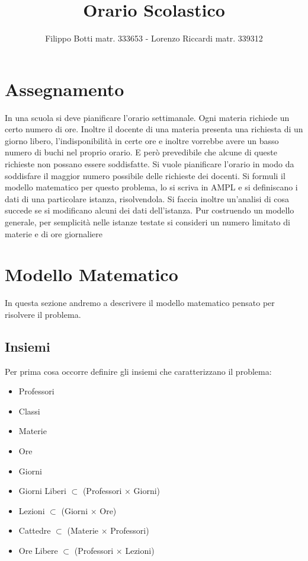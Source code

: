 \documentclass{article}
\title{Orario Scolastico}
\author{Filippo Botti matr. 333653 - Lorenzo Riccardi matr. 339312}
\begin{document}
\maketitle



\section{Assegnamento}
In una scuola si deve pianificare l’orario settimanale. Ogni materia richiede un
certo numero di ore. Inoltre il docente di una materia presenta una richiesta di
un giorno libero, l’indisponibilità in certe ore e inoltre vorrebbe avere un basso
numero di buchi nel proprio orario. E però prevedibile che alcune di queste
richieste non possano essere soddisfatte. Si vuole pianificare l’orario in modo da
soddisfare il maggior numero possibile delle richieste dei docenti.
Si formuli il modello matematico per questo problema, lo si scriva in AMPL
e si definiscano i dati di una particolare istanza, risolvendola. Si faccia inoltre
un’analisi di cosa succede se si modificano alcuni dei dati dell’istanza. Pur
costruendo un modello generale, per semplicità nelle istanze testate si consideri
un numero limitato di materie e di ore giornaliere

\section{Modello Matematico}
In questa sezione andremo a descrivere il modello matematico pensato per risolvere il problema. 
\subsection{Insiemi}
Per prima cosa occorre definire gli insiemi che caratterizzano il problema:
\begin{itemize}
    \item Professori
    \item Classi
    \item Materie
    \item Ore
    \item Giorni
    \item Giorni Liberi $\subset$ (Professori $\times$ Giorni)
    \item Lezioni $\subset$ (Giorni $\times$ Ore)
    \item Cattedre $\subset$ (Materie $\times$ Professori)
    \item Ore Libere $\subset$ (Professori $\times$ Lezioni)
\end{itemize}
\end{document}
